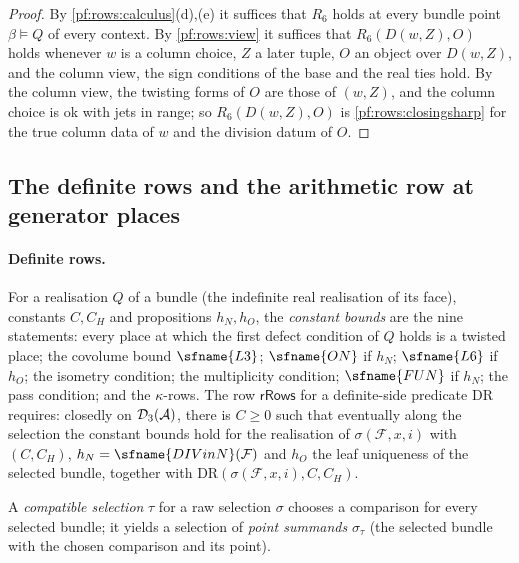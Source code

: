 \begin{proof}
By \cref{pf:rows:calculus}(d),(e) it suffices that $R_6$ holds at every bundle point $\beta\models Q$ of every context. By
\cref{pf:rows:view} it suffices that $R_6(D(w,Z),O)$ holds whenever $w$ is a column choice, $Z$ a later tuple, $O$ an object over
$D(w,Z)$, and the column view, the sign conditions of the base and the real ties hold. By the column view, the twisting forms of
$O$ are those of $(w,Z)$, and the column choice is ok with jets in range; so $R_6(D(w,Z),O)$ is \cref{pf:rows:closingsharp} for the
true column data of $w$ and the division datum of $O$.
\end{proof}

\subsection{The definite rows and the arithmetic row at generator places}\label{sec:pf:rows:rrows}

\paragraph{Definite rows.}
For a realisation $Q$ of a bundle (the indefinite real realisation of its face), constants $C,C_H$ and propositions
$h_N,h_O$, the \emph{constant bounds} are the nine statements: every place at which the first defect condition of $Q$
holds is a twisted place; the covolume bound $\sfname{L3}$; $\sfname{ON}$ if $h_N$; $\sfname{L6}$ if $h_O$; the isometry
condition; the multiplicity condition; $\sfname{FUN}$ if $h_N$; the pass condition; and the $\kappa$-rows. The row
$\mathsf{rRows}$ for a definite-side predicate $\mathrm{DR}$ requires: closedly on $\mathcal{D}_3(\mathcal A)$, there is $C\ge0$
such that eventually along the selection the constant bounds hold for the realisation of $\sigma(\mathcal F,x,i)$ with
$(C,C_H)$, $h_N=\sfname{DIVinN}(\mathcal F)$ and $h_O$ the leaf uniqueness of the selected bundle, together with
$\mathrm{DR}(\sigma(\mathcal F,x,i),C,C_H)$.

A \emph{compatible selection} $\tau$ for a raw selection $\sigma$ chooses a comparison for every selected bundle; it
yields a selection of \emph{point summands} $\sigma_\tau$ (the selected bundle with the chosen comparison and its point).

